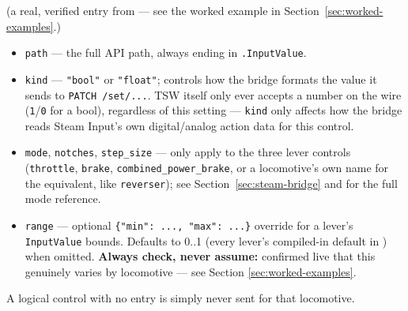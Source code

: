 \documentclass[11pt,a4paper]{article}
\newcommand{\code}[1]{\texttt{#1}}
\begin{document}
(a real, verified entry from 
--- see the worked example in Section~\ref{sec:worked-examples}.)

\begin{itemize}[leftmargin=1.5em]
    \item \code{path} --- the full API path, always ending in
    \code{.InputValue}.
    \item \code{kind} --- \code{"bool"} or \code{"float"}; controls how
    the bridge formats the value it sends to \code{PATCH /set/...}. TSW
    itself only ever accepts a number on the wire (\code{1}/\code{0} for
    a bool), regardless of this setting --- \code{kind} only affects how
    the bridge reads Steam Input's own digital/analog action data for
    this control.
    \item \code{mode}, \code{notches}, \code{step\_size} --- only apply to
    the three lever controls (\code{throttle}, \code{brake},
    \code{combined\_power\_brake}, or a locomotive's own name for the
    equivalent, like \code{reverser}); see Section~\ref{sec:steam-bridge}
    and  for the full mode reference.
    \item \code{range} --- optional \code{\{"min": ..., "max": ...\}}
    override for a lever's \code{InputValue} bounds. Defaults to 0..1
    (every lever's compiled-in default in ) when
    omitted. \textbf{Always check, never assume:} confirmed live that
    this genuinely varies by locomotive --- see Section
    \ref{sec:worked-examples}.
\end{itemize}

A logical control with no entry is simply never sent for that locomotive.
\end{document}
